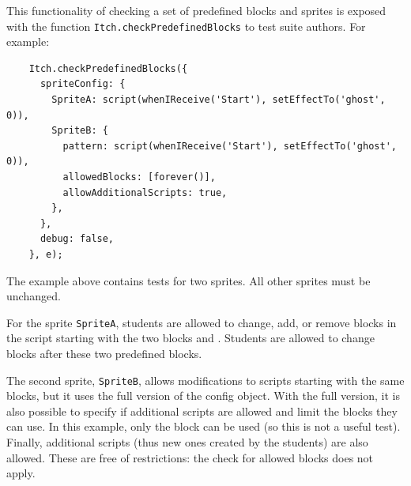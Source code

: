 \documentclass[../main]{subfiles}
\begin{document}
This functionality of checking a set of predefined blocks and sprites is exposed with the function \texttt{Itch.checkPredefinedBlocks} to test suite authors.
For example:

\begin{verbatim}
    Itch.checkPredefinedBlocks({
      spriteConfig: {
        SpriteA: script(whenIReceive('Start'), setEffectTo('ghost', 0)),
        SpriteB: {
          pattern: script(whenIReceive('Start'), setEffectTo('ghost', 0)),
          allowedBlocks: [forever()],
          allowAdditionalScripts: true,
        },
      },
      debug: false,
    }, e);
\end{verbatim}

The example above contains tests for two sprites.
All other sprites must be unchanged.

For the sprite \texttt{SpriteA}, students are allowed to change, add, or remove blocks in the script starting with the two blocks  and .
Students are allowed to change blocks after these two predefined blocks.

The second sprite, \texttt{SpriteB}, allows modifications to scripts starting with the same blocks, but it uses the full version of the config object.
With the full version, it is also possible to specify if additional scripts are allowed and limit the blocks they can use.
In this example, only the  block can be used (so this is not a useful test).
Finally, additional scripts (thus new ones created by the students) are also allowed.
These are free of restrictions: the check for allowed blocks does not apply.
\end{document}
